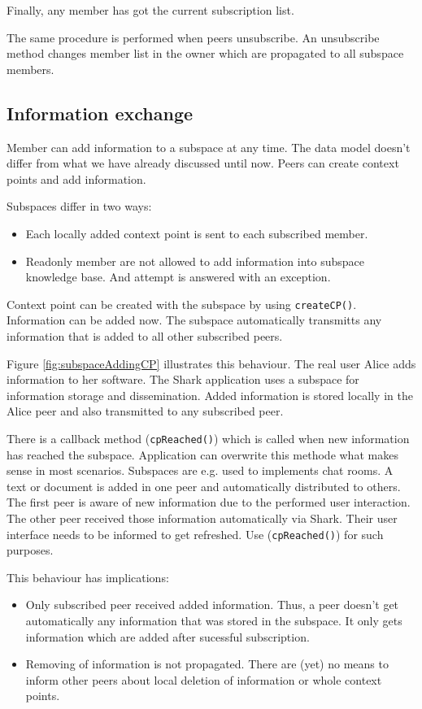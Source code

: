 Finally, any member has got the current subscription list.

The same procedure is performed when peers unsubscribe. An unsubscribe method changes member list in the owner which are propagated to all subspace members.

\subsection{Information exchange}
Member can add information to a subspace at any time. The data model doesn't differ from what we have already discussed until now. Peers can create context points and add information.

Subspaces differ in two ways: 

\begin{itemize}
\item 
Each locally added context point is sent
to each subscribed member.
\item 
Readonly member are not allowed to add information into subspace knowledge
base. And attempt is answered with an exception.
\end{itemize}

Context point can be created with the subspace by using {\verb|createCP()|}. 
Information can be added now. The subspace automatically transmitts any 
information that is added to all other subscribed peers.

Figure \ref{fig:subspaceAddingCP} illustrates this behaviour. The real user Alice adds information to her software. The Shark application uses a subspace for information storage and dissemination. Added information is stored locally in the Alice peer and also transmitted to any subscribed peer.

There is a callback method ({\verb|cpReached()|}) which is called when new
information has reached the subspace. Application can overwrite this methode
what makes sense in most scenarios. Subspaces are e.g. used to implements 
chat rooms. A text or document is added in one peer and automatically 
distributed to others. The first peer is aware of new information due to
the performed user interaction. The other peer received those information
automatically via Shark. Their user interface needs to be informed to 
get refreshed. Use ({\verb|cpReached()|}) for such purposes.

This behaviour has implications:

\begin{itemize}
\item 
Only subscribed peer received added information. Thus, a peer doesn't get
automatically any information that was stored in the subspace. It only gets
information which are added after sucessful subscription.

\item 
Removing of information is not propagated. There are (yet) no means to inform
other peers about local deletion of information or whole context points.

\end{itemize}


